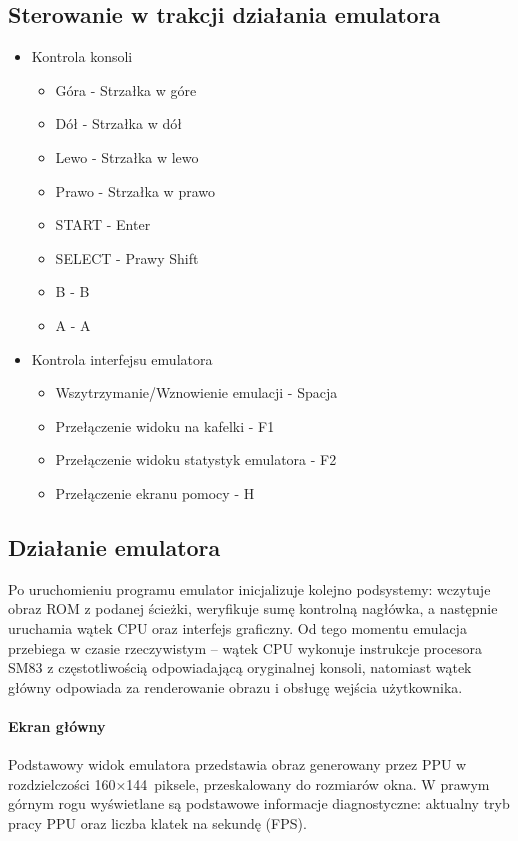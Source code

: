 \documentclass{article}
\begin{document}
\subsection{Sterowanie w trakcji działania emulatora}\label{controls}

\begin{itemize}
	\item Kontrola konsoli
	\begin{itemize}
		\item Góra - Strzałka w góre
		\item Dół - Strzałka w dół
		\item Lewo - Strzałka w lewo
		\item Prawo - Strzałka w prawo
		\item START - Enter
		\item SELECT - Prawy Shift
		\item B - B
		\item A - A
	\end{itemize}
	\item Kontrola interfejsu emulatora
	\begin{itemize}
	\item Wszytrzymanie/Wznowienie emulacji - Spacja
	\item Przełączenie widoku na kafelki - 	F1
	\item  Przełączenie widoku statystyk emulatora - F2
	\item Przełączenie ekranu pomocy - H
	\end{itemize}
\end{itemize}

\subsection{Działanie emulatora}

Po uruchomieniu programu emulator inicjalizuje kolejno podsystemy: wczytuje obraz
ROM z podanej ścieżki, weryfikuje sumę kontrolną nagłówka, a następnie uruchamia
wątek CPU oraz interfejs graficzny. Od tego momentu emulacja przebiega w czasie
rzeczywistym -- wątek CPU wykonuje instrukcje procesora SM83 z częstotliwością
odpowiadającą oryginalnej konsoli, natomiast wątek główny odpowiada za renderowanie
obrazu i obsługę wejścia użytkownika.

\paragraph{Ekran główny}
Podstawowy widok emulatora przedstawia obraz generowany przez PPU w rozdzielczości
160$\times$144~piksele, przeskalowany do rozmiarów okna. W prawym górnym rogu
wyświetlane są podstawowe informacje diagnostyczne: aktualny tryb pracy PPU oraz
liczba klatek na sekundę (FPS).
\end{document}
